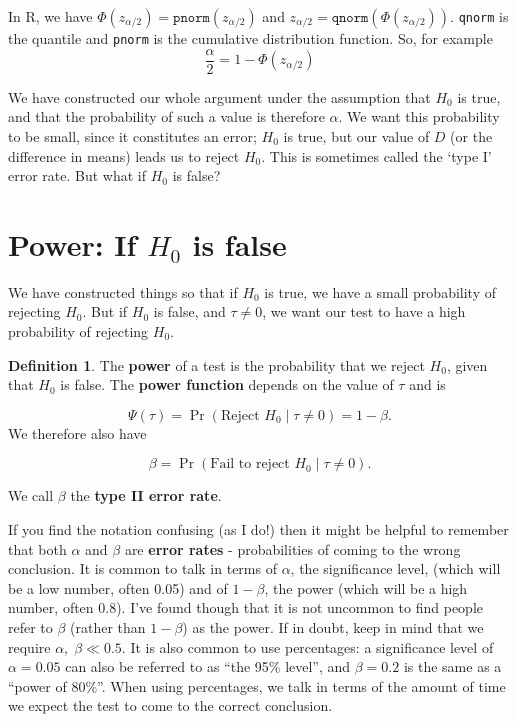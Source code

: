 \documentclass[
  openany]{book}
\theoremstyle{definition}
\newtheorem{definition}{Definition}[chapter]
\theoremstyle{definition}
\theoremstyle{definition}
\theoremstyle{definition}
\theoremstyle{remark}
\begin{document}
In R, we have \(\Phi\left(z_{\alpha/2}\right) = \texttt{pnorm}\left(z_{\alpha/2}\right)\) and \(z_{\alpha/2} = \texttt{qnorm}\left(\Phi\left(z_{\alpha/2}\right)\right)\). \texttt{qnorm} is the quantile and \texttt{pnorm} is the cumulative distribution function. So, for example
\[\frac{\alpha}{2} = 1 - \Phi\left(z_{\alpha/2}\right)\]

We have constructed our whole argument under the assumption that \(H_0\) is true, and that the probability of such a value is therefore \(\alpha\). We want this probability to be small, since it constitutes an error; \(H_0\) is true, but our value of \(D\) (or the difference in means) leads us to reject \(H_0\). This is sometimes called the `type I' error rate. But what if \(H_0\) is false?

\section{\texorpdfstring{Power: If \(H_0\) is false}{Power: If H\_0 is false}}\label{sec-power}

We have constructed things so that if \(H_0\) is true, we have a small probability of rejecting \(H_0\). But if \(H_0\) is false, and \(\tau\neq{0}\), we want our test to have a high probability of rejecting \(H_0\).

\begin{definition}
The \textbf{power} of a test is the probability that we reject \(H_0\), given that \(H_0\) is false. The \textbf{power function} depends on the value of \(\tau\) and is

\[\Psi\left(\tau\right) = \Pr\left(\text{Reject } H_0\mid{\tau\neq{0}}\right) = 1 - \beta.\]
We therefore also have

\[\beta = \Pr\left(\text{Fail to reject } H_0\mid{\tau\neq{0}}\right). \]

We call \(\beta\) the \textbf{type II error rate}.
\end{definition}

If you find the notation confusing (as I do!) then it might be helpful to remember that both \(\alpha\) and \(\beta\) are \textbf{error rates} - probabilities of coming to the wrong conclusion. It is common to talk in terms of \(\alpha\), the significance level, (which will be a low number, often 0.05) and of \(1-\beta\), the power (which will be a high number, often 0.8). I've found though that it is not uncommon to find people refer to \(\beta\) (rather than \(1-\beta\)) as the power. If in doubt, keep in mind that we require \(\alpha,\;\beta \ll 0.5\). It is also common to use percentages: a significance level of \(\alpha=0.05\) can also be referred to as ``the 95\% level'', and \(\beta=0.2\) is the same as a ``power of 80\%''. When using percentages, we talk in terms of the amount of time we expect the test to come to the correct conclusion.
\end{document}

